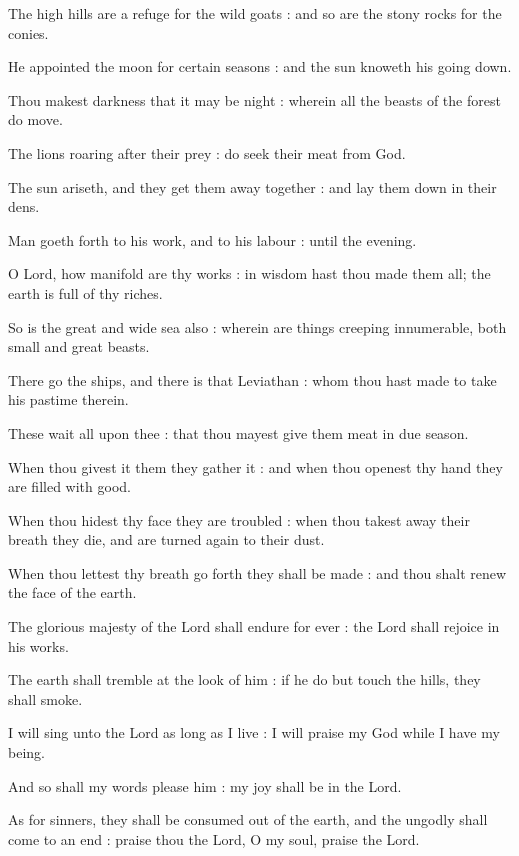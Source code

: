 The high hills are a refuge for the wild goats : and so are the stony rocks for the conies.\par
{}He appointed the moon for certain seasons : and the sun knoweth his going down.\par
{}Thou makest darkness that it may be night : wherein all the beasts of the forest do move.\par
{}The lions roaring after their prey : do seek their meat from God.\par
{}The sun ariseth, and they get them away together : and lay them down in their dens.\par
{}Man goeth forth to his work, and to his labour : until the evening.\par
{}O Lord, how manifold are thy works : in wisdom hast thou made them all; the earth is full of thy riches.\par
{}So is the great and wide sea also : wherein are things creeping innumerable, both small and great beasts.\par
{}There go the ships, and there is that Leviathan : whom thou hast made to take his pastime therein.\par
{}These wait all upon thee : that thou mayest give them meat in due season.\par
{}When thou givest it them they gather it : and when thou openest thy hand they are filled with good.\par
{}When thou hidest thy face they are troubled : when thou takest away their breath they die, and are turned again to their dust.\par
{}When thou lettest thy breath go forth they shall be made : and thou shalt renew the face of the earth.\par
{}The glorious majesty of the Lord shall endure for ever : the Lord shall rejoice in his works.\par
{}The earth shall tremble at the look of him : if he do but touch the hills, they shall smoke.\par
{}I will sing unto the Lord as long as I live : I will praise my God while I have my being.\par
{}And so shall my words please him : my joy shall be in the Lord.\par
{}As for sinners, they shall be consumed out of the earth, and the ungodly shall come to an end : praise thou the Lord, O my soul, praise the Lord.\par

